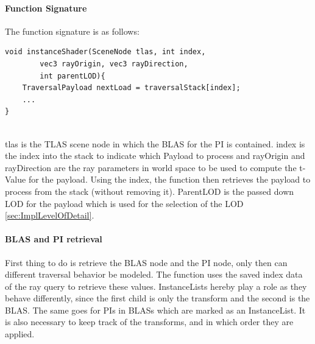 \paragraph{Function Signature}
The function signature is as follows:
\begin{lstlisting}
void instanceShader(SceneNode tlas, int index, 
        vec3 rayOrigin, vec3 rayDirection, 
        int parentLOD){	
	TraversalPayload nextLoad = traversalStack[index];
    ...
}
    
\end{lstlisting}
tlas is the TLAS scene node in which the BLAS for the PI is contained. index is the index into the stack to indicate which Payload to process and rayOrigin and rayDirection are the ray parameters in world space to be used to compute the t-Value for the payload. Using the index, the function then retrieves the payload to process from the stack (without removing it). ParentLOD is the passed down LOD for the payload which is used for the selection of the LOD \ref{sec:ImplLevelOfDetail}.
\newpage
\paragraph{BLAS and PI retrieval}
First thing to do is retrieve the BLAS node and the PI node, only then can different traversal behavior be modeled. The function uses the saved index data of the ray query to retrieve these values. InstanceLists hereby play a role as they behave differently, since the first child is only the transform and the second is the BLAS. The same goes for PIs in BLASs which are marked as an InstanceList. It is also necessary to keep track of the transforms, and in which order they are applied.

